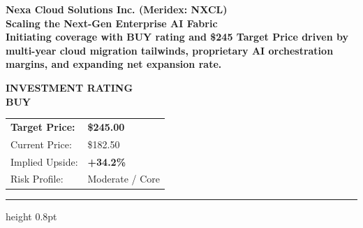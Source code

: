 \documentclass[10pt,a4paper]{scrartcl}
\begin{document}
\begin{minipage}[t]{0.67\textwidth}
    \vspace{0pt}
    \textcolor{NavyPrimary}{\Large\textbf{Nexa Cloud Solutions Inc. (Meridex: NXCL)}} \\[3pt]
    \textcolor{NavyDark}{\huge\textbf{Scaling the Next-Gen Enterprise AI Fabric}} \\[6pt]
    \textcolor{TextMuted}{\small\textbf{Initiating coverage with BUY rating and \$245 Target Price driven by multi-year cloud migration tailwinds, proprietary AI orchestration margins, and expanding net expansion rate.}}
\end{minipage}%
\hfill
\begin{minipage}[t]{0.31\textwidth}
    \vspace{0pt}
    \begin{tcolorbox}[targetbox, top=4pt, bottom=4pt, left=6pt, right=6pt]
        \centering
        \small\textcolor{NavyPrimary}{\textbf{INVESTMENT RATING}} \\[2pt]
        {\Huge\textbf{\textcolor{BuyGreen}{BUY}}} \\[4pt]
        \small
        \begin{tabular}{@{}ll@{}}
            \textbf{Target Price:} & \textbf{\$245.00} \\
            Current Price: & \$182.50 \\
            Implied Upside: & \textcolor{BuyGreen}{\textbf{+34.2\%}} \\
            Risk Profile: & Moderate / Core
        \end{tabular}
    \end{tcolorbox}
\end{minipage}

\vspace{8pt}
\hrule height 0.8pt
\vspace{8pt}
\end{document}
